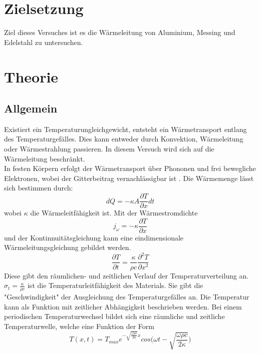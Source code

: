 \section{Zielsetzung}
\label{sec:Ziel}
Ziel dieses Versuches ist es die Wärmeleitung von Aluminium, Messing und Edelstahl zu untersuchen.
\section{Theorie}
\label{sec:Theorie}
 

\subsection{Allgemein}

\noindent Existiert ein Temperaturungleichgewicht, entsteht ein Wärmetransport entlang des Temperaturgefälles. 
Dies kann entweder durch Konvektion, Wärmeleitung oder Wärmestrahlung passieren.
In diesem Versuch wird sich auf die Wärmeleitung beschränkt.\\
In festen Körpern erfolgt der Wärmetransport über Phononen und frei bewegliche Elektronen, wobei der Gitterbeitrag vernachlässigbar ist \cite[1]{V204}.
Die Wärmemenge lässt sich bestimmen durch:
\begin{equation}
    dQ = -\kappa A \frac{\partial T}{\partial x} dt
    \label{eqn:Wärmemenge}
\end{equation}
wobei $\kappa$ die Wärmeleitfähigkeit ist.
Mit der Wärmestromdichte
\begin{equation}
    j_{\omega} = -\kappa\frac{\partial T}{\partial x}
    \label{eqn:Wärmestromdichte}
\end{equation}
und der Kontinnuitätsgleichung kann eine eindimensionale Wärmeleitungsgleichung gebildet werden.
\begin{equation}
    \frac{\partial T}{\partial t} = \frac{\kappa}{\rho c} \frac{\partial ^2 T}{\partial x^2}
    \label{eqn:1D-Wärmeleitungsgleichung}
\end{equation}
Diese gibt den räumlichen- und zeitlichen Verlauf der Temperaturverteilung an.
$\sigma_t = \frac{\kappa}{\rho c}$ ist die Temperaturleitfähigkeit des Materials.
Sie gibt die "Geschwindigkeit" der Ausgleichung des Temperaturgefälles an.
Die Temperatur kann als Funktion mit zeitlicher Abhängigkeit beschrieben werden.
Bei einem periodischen Temperaturwechsel bildet sich eine räumliche und zeitliche Temperaturwelle, welche eine Funktion der Form
\begin{equation}
   T(x,t) = T_{max} e^{-\sqrt{\frac{\omega \rho c}{2 \kappa}}x} cos \Biggl(\omega t - \sqrt{\frac{\omega \rho c}{2 \kappa}}\Biggr)
   \label{eqn:periTempWel}
\end{equation} 
